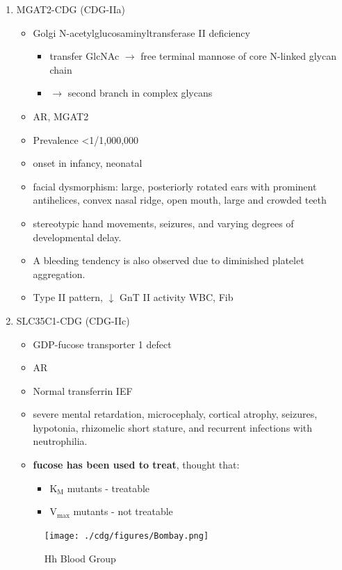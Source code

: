 \documentclass{scrartcl}
\begin{document}
\begin{enumerate}
\item MGAT2-CDG (CDG-IIa)
\label{sec:org0809114}
\begin{itemize}
\item Golgi N-acetylglucosaminyltransferase II deficiency
\begin{itemize}
\item transfer GlcNAc \(\to\) free terminal mannose of core N-linked glycan chain
\item \(\to\) second branch in complex glycans
\end{itemize}
\item AR, MGAT2
\item Prevalence \textless{}1/1,000,000
\item onset in infancy, neonatal
\item facial dysmorphism: large, posteriorly rotated ears with prominent
antihelices, convex nasal ridge, open mouth, large and crowded
teeth
\item stereotypic hand movements, seizures, and varying degrees of
developmental delay.
\item A bleeding tendency is also observed due to diminished platelet
aggregation.
\item Type II pattern, \(\downarrow\) GnT II activity WBC, Fib
\end{itemize}

\item SLC35C1-CDG (CDG-IIc)
\label{sec:orga3df1e5}
\begin{itemize}
\item GDP-fucose transporter 1	defect
\item AR
\item Normal transferrin IEF
\item severe mental retardation, microcephaly, cortical atrophy, seizures,
hypotonia, rhizomelic short stature, and recurrent infections with
neutrophilia.
\item \textbf{fucose has been used to treat}, thought that:
\begin{itemize}
\item K\(_{\text{M}}\) mutants - treatable
\item V\(_{\text{max}}\) mutants - not treatable
\end{itemize}
\end{itemize}

\begin{figure}[htbp]
\centering
\texttt{[image: ./cdg/figures/Bombay.png]}
\caption[Hh]{\label{fig:org781f429}
Hh Blood Group}
\end{figure}
\end{enumerate}
\end{document}
